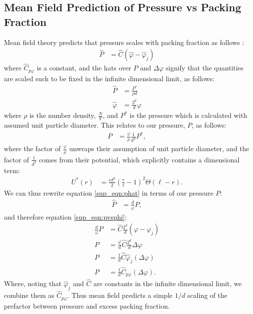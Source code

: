 \subsection{Mean Field Prediction of Pressure vs Packing Fraction}

Mean field theory predicts that pressure scales with packing fraction as follows \cite{parisi_theory_2020}:
\begin{align}
 \hat{P} &= \hat{C}(\hat{\varphi} - \hat{\varphi}_j) \label{sup_eqn:pvsphi}
 \end{align}
 where $\hat{C}_{p\varphi}$ is a constant, and the hats over $P$ and $\Delta \varphi$ signify that the quantities are scaled such to be fixed in the infinite dimensional limit, as follows:
 \begin{align}
\hat{P} &= \frac{P^*}{\rho d} \label{sup_eqn:phat} \\
\hat{\varphi} &= \frac{2^d}{d} \varphi %
 \end{align}
where $\rho$ is the number density, $\frac{N}{V}$, and $P^*$ is the pressure which is calculated with assumed unit particle diameter. This relates to our pressure, $P$, as follows:
\begin{align}
 P & = \frac{\varphi}{\rho} \frac{1}{d^2} P^* \label{sup_eqn:pstar} , 
\end{align}
where the factor of $\frac{\varphi}{\rho}$ unwraps their assumption of unit particle diameter, and the factor of $\frac{1}{d^2}$ comes from their potential, which explicitly contains a dimensional term:
\begin{align}
 U^*(r) &= \frac{\epsilon d^2}{2} \left(\frac{r}{\ell}-1\right)^2 \Theta\left(\ell-r\right).
\end{align}
We can thus rewrite equation \ref{sup_eqn:phat} in terms of our pressure $P$:
\begin{align}
 \hat{P} &= \frac{d}{\varphi}P,
\end{align}
 and therefore equation \ref{sup_eqn:pvsphi}:
 \begin{align}
  \frac{d}{\varphi}P &=\hat{C}\frac{2^d}{d}( \varphi - \varphi_j) \\
  P &= \frac{\varphi}{d} \hat{C} \frac{2^d}{d} \Delta \varphi \\
  P &= \frac{1}{d}\hat{C}\hat{\varphi}_j( \Delta \varphi) \\
   P &= \frac{1}{d}\hat{C}_{p\varphi}( \Delta \varphi). \label{sup_eqn:finalpvsphi}
\end{align}
%
Where, noting that $\hat{\varphi}_j$ and $\hat{C}$ are constants in the infinite dimensional limit, we combine them as $\hat{C}_{p\varphi}$. Thus mean field predicts a simple $1/d$ scaling of the prefactor between pressure and excess packing fraction.


